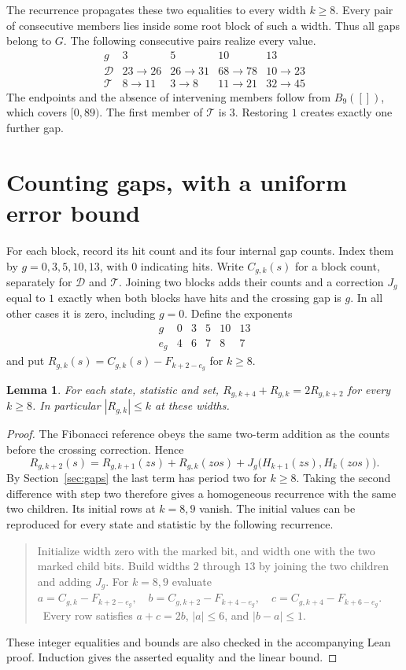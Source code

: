 \documentclass[11pt]{article}
\newtheorem{lemma}[theorem]{Lemma}
\newcommand{\D}{\mathcal D}
\newcommand{\T}{\mathcal T}
\begin{document}
The recurrence propagates these two equalities to every width $k\ge8$.
Every pair of consecutive members lies inside some root block of such a
width. Thus all gaps belong to $G$. The following consecutive pairs realize every value.
\[
\begin{array}{c|cccc}
g&3&5&10&13\\ \hline
\D&23\to26&26\to31&68\to78&10\to23\\
\T&8\to11&3\to8&11\to21&32\to45
\end{array}
\]
The endpoints and the absence of intervening members follow from $B_9([])$,
which covers $[0,89)$. The first member of $\T$ is $3$. Restoring $1$
creates exactly one further gap.

\newpage
\section{Counting gaps, with a uniform error bound}\label{sec:counts}
For each block, record its hit count and its four internal gap counts. Index them by $g=0,3,5,10,13$, with $0$ indicating hits. Write
$C_{g,k}(s)$ for a block count, separately for $\D$ and $\T$. Joining two
blocks adds their counts and a correction $J_g$ equal to $1$ exactly when
both blocks have hits and the crossing gap is $g$. In all other cases it is
zero, including $g=0$. Define the exponents
\[
\begin{array}{c|ccccc}
 g&0&3&5&10&13\\ \hline e_g&4&6&7&8&7
\end{array}
\]
and put $R_{g,k}(s)=C_{g,k}(s)-F_{k+2-e_g}$ for $k\ge8$.

\begin{lemma}\label{affine}
For each state, statistic and set, $R_{g,k+4}+R_{g,k}=2R_{g,k+2}$ for
every $k\ge8$. In particular $|R_{g,k}|\le k$ at these widths.
\end{lemma}
\begin{proof}
The Fibonacci reference obeys the same two-term addition as the counts
before the crossing correction. Hence
\[
 R_{g,k+2}(s)=R_{g,k+1}(zs)+R_{g,k}(zos)
     +J_g\big(H_{k+1}(zs),H_k(zos)\big).
\]
By Section~\ref{sec:gaps} the last term has period two for $k\ge8$.
Taking the second difference with step two therefore gives a homogeneous
recurrence with the same two children. Its initial rows at $k=8,9$ vanish.
The initial values can be reproduced for every state and statistic
by the following recurrence.
\begin{quote}\small
Initialize width zero with the marked bit, and width one with the two
marked child bits. Build widths $2$ through $13$ by joining the two
children and adding $J_g$. For $k=8,9$ evaluate\
$\displaystyle a=C_{g,k}-F_{k+2-e_g},\quad
 b=C_{g,k+2}-F_{k+4-e_g},\quad c=C_{g,k+4}-F_{k+6-e_g}.$\
Every row satisfies $a+c=2b$, $|a|\le6$, and $|b-a|\le1$.
\end{quote}
These integer equalities and bounds are also checked in the accompanying
Lean proof. Induction gives the asserted equality and the linear bound.
\end{proof}
\end{document}

